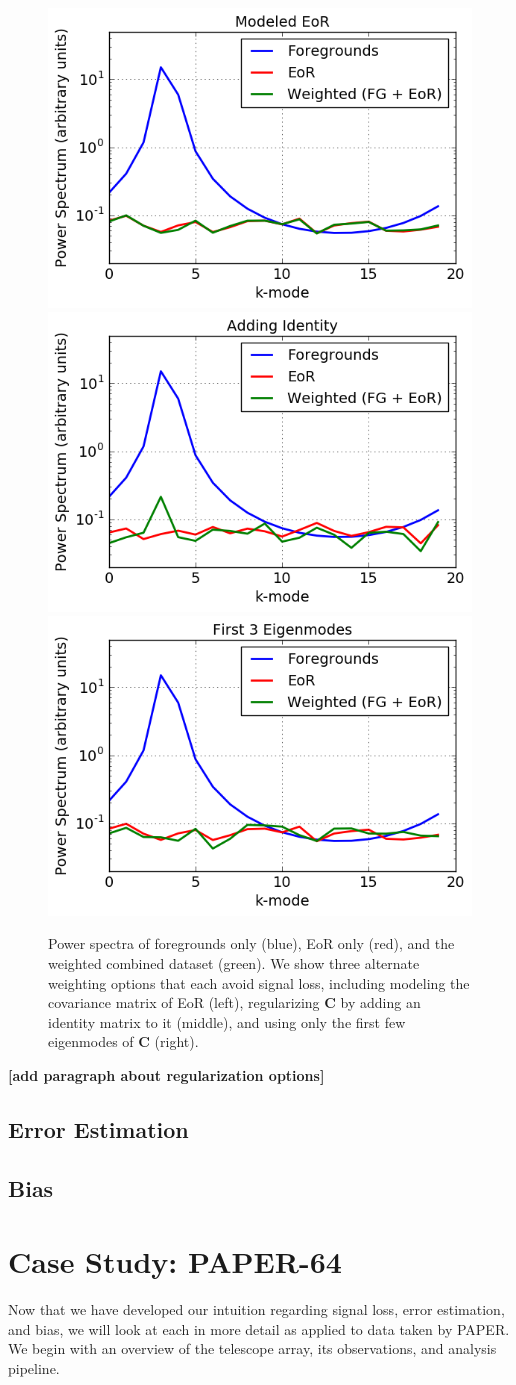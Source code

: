 \documentclass[preprint2,numberedappendix,tighten,twocolappendix]{aastex6}  %
\newcommand{\cc}[1]{{\color{purple} \textbf{[#1]}}}
\begin{document}
\begin{figure}
	\centering
	\includegraphics[height=0.21\textwidth]{plots/toy_sigloss10.png}
	\includegraphics[height=0.21\textwidth]{plots/toy_sigloss8.png}
	\includegraphics[height=0.21\textwidth]{plots/toy_sigloss9.png}
	\caption{Power spectra of foregrounds only (blue), EoR only (red), and the weighted combined dataset (green). We show three alternate weighting options that each avoid signal loss, including modeling the covariance matrix of EoR (left), regularizing $\textbf{C}$ by adding an identity matrix to it (middle), and using only the first few eigenmodes of $\textbf{C}$ (right).}
	\label{fig:toy_sigloss8}
\end{figure}

\cc{add paragraph about regularization options}

\subsection{Error Estimation}
\label{sec:ErrorOverview}

\subsection{Bias}
\label{sec:BiasOverview}

\section{Case Study: PAPER-64}
\label{sec:CaseStudy}

Now that we have developed our intuition regarding signal loss, error estimation, and bias, we will look at each in more detail as applied to data taken by PAPER. We begin with an overview of the telescope array, its observations, and analysis pipeline.
\end{document}
